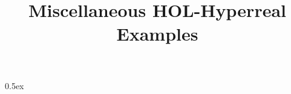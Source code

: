\documentclass[11pt,a4paper]{article}
\begin{document}
\title{Miscellaneous HOL-Hyperreal Examples}
\maketitle

\tableofcontents

\parindent 0pt\parskip 0.5ex

\end{document}
